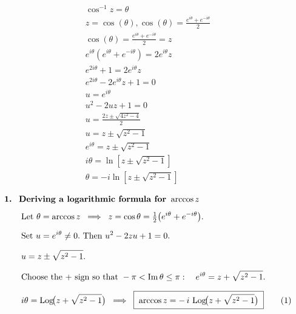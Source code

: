 \documentclass[12pt]{article}
\DeclareMathOperator{\Log}{Log}
\DeclareMathOperator{\Arg}{Arg}
\theoremstyle{definition} %
\theoremstyle{plain} %
\begin{document}
\begin{align}
  \cos^{-1}z=\theta \\[10pt] 
  z = \cos(\theta), \cos(\theta)=\frac{e^{i\theta}+e^{-i\theta}}{2} \\[10pt] 
  \cos(\theta)=\frac{e^{i\theta}+e^{-i\theta}}{2} = z \\[10pt] 
  e^{i\theta}(e^{i\theta}+e^{-i\theta})=2e^{i\theta}z \\[10pt] 
  e^{2i\theta}+1=2e^{i\theta}z \\[10pt] 
  e^{2i\theta}-2e^{i\theta}z+1=0 \\[10pt] 
  u =e^{i\theta} \\[10pt] 
  u^{2}-2uz +1=0\\[10pt] 
  u= \frac{2z \pm \sqrt{4z^{2}-4}}{2}\\[10pt] 
  u = z \pm \sqrt{z^{2}-1} \\[10pt] 
  e^{i\theta}=z \pm \sqrt{z^{2}-1} \\[10pt] 
  i\theta = \ln \left[ z \pm \sqrt{z^{2}-1}  \right] \\[10pt] 
  \theta = -i \ln \left[ z\pm \sqrt{z^{2}-1}  \right] 
\end{align}
\pagebreak
%

\begin{align*}
  &\textbf{1.\; Deriving a logarithmic formula for } \arccos z\\[4pt]
  &\qquad
  \text{Let } \theta = \arccos z \;\; \Longrightarrow \;\;
       z=\cos\theta
         =\tfrac12\bigl(e^{i\theta}+e^{-i\theta}\bigr). \\[6pt]
  &\qquad
  \text{Set } u = e^{i\theta}\neq 0. \text{ Then } \displaystyle
       u^2 - 2zu + 1 = 0. \\[6pt]
  &\qquad
  u
    = z \pm \sqrt{z^{2}-1}. \\[6pt]
  &\qquad
  \text{Choose the \(+\) sign so that } -\pi<\Im\theta\le\pi:
       \quad e^{i\theta}= z + \sqrt{z^{2}-1}. \\[6pt]
  &\qquad
  i\theta = \Log\!\bigl(z+\sqrt{z^{2}-1}\bigr)
  \;\; \Longrightarrow\;\;
  \boxed{\;
     \arccos z
       = -\,i\,\Log\!\bigl(z+\sqrt{z^{2}-1}\bigr)
    \;}
  \tag{1}
  \end{align*}
  
\end{document}
